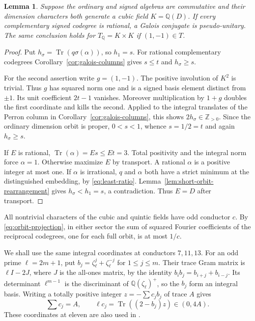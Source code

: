 \documentclass[11pt,reqno]{amsart}
\newtheorem{lemma}[theorem]{Lemma}
\theoremstyle{remark}\newtheorem{remark}[theorem]{Remark}
\numberwithin{equation}{section}
\begin{document}
\begin{lemma}\label{lem:odd-shift}
Suppose the ordinary and signed algebras are commutative and their
dimension characters both generate a cubic field $K=\mathbb Q(D)$.
If every complementary signed codegree is rational, a Galois conjugate
is pseudo-unitary. The same conclusion holds for $T_{\mathbb Q}=K\times K$
if $(1,-1)\in T$.
\end{lemma}
\begin{proof}
Put $h_\sigma=\operatorname{Tr}(q\sigma(\alpha))$, so $h_1=s$.
For rational complementary codegrees Corollary~\ref{cor:galois-columns}
gives $s\le t$ and $h_\sigma\ge s$.

For the second assertion write $g=(1,-1)$. The positive involution of
$K^2$ is trivial. Thus $g$ has squared norm one and is a signed basis
element distinct from $\pm1$. Its unit coefficient $2t-1$ vanishes.
Moreover multiplication by $1+g$ doubles the first coordinate and
kills the second. Applied to the integral translates of the Perron
column in Corollary~\ref{cor:galois-columns}, this shows
$2h_\sigma\in\mathbb Z_{>0}$. Since the ordinary dimension orbit
is proper, $0<s<1$, whence $s=1/2=t$ and again $h_\sigma\ge s$.

If $E$ is rational, $\operatorname{Tr}(\alpha)=Es\le Et=3$.
Total positivity and the integral norm force $\alpha=1$.
Otherwise maximize $E$ by transport. A rational $\alpha$ is a positive
integer at most one. If $\alpha$ is irrational, $q$ and $\alpha$
both have a strict minimum at the distinguished embedding, by
\eqref{eq:least-ratio}. Lemma~\ref{lem:short-orbit-rearrangement}
gives $h_\sigma<h_1=s$, a contradiction. Thus $E=D$ after transport.
\end{proof}

All nontrivial characters of the cubic and quintic fields have odd
conductor $c$. By \eqref{eq:orbit-projection}, in either sector the
sum of squared Fourier coefficients of the reciprocal codegrees,
one for each full orbit, is at most $1/c$.

We shall use the same integral coordinates at conductors $7,11,13$.
For an odd prime $\ell=2m+1$, put $b_j=\zeta_\ell^j+\zeta_\ell^{-j}$
for $1\le j\le m$. Their trace Gram matrix is $\ell I-2J$, where
$J$ is the all-ones matrix, by the identity $b_ib_j=b_{i+j}+b_{i-j}$.
Its determinant $\ell^{m-1}$ is the discriminant of
$\mathbb Q(\zeta_\ell)^+$, so the $b_j$ form an integral basis.
Writing a totally positive integer $z=-\sum c_jb_j$ of trace $A$
gives
\begin{equation}\label{eq:odd-cycle-coordinates}
 \sum c_j=A,\qquad
 \ell c_j=\operatorname{Tr}((2-b_j)z)\in(0,4A).
\end{equation}
These coordinates at eleven are also used in \cite[\S8.2]{Class6Rank5}.
\end{document}
